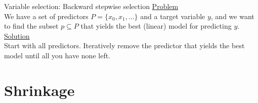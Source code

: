 \documentclass[8pt]{beamer}
\begin{document}
    \begin{frame}[t]{Variable selection: Backward stepwise selection}
        \underline{Problem}\\
        We have a set of predictors $P=\{x_0, x_1, ...\}$ and a target variable $y$, and we want to find the subset $p \subseteq P$ that yields the best (linear) model for predicting $y$.\\
        \vspace{0.25cm}
        \underline{Solution}\\
        Start with all predictors. Iteratively remove the predictor that yields the best model until all you have none left.\\
    \end{frame}

    \section{Shrinkage}

    \def\codewidth{5.2cm}
\end{document}
